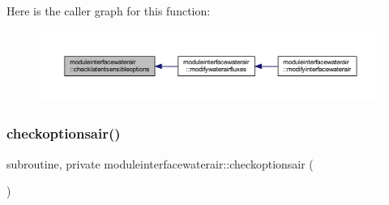 Here is the caller graph for this function\+:\nopagebreak
\begin{figure}[H]
\begin{center}
\leavevmode
\includegraphics[width=350pt]{namespacemoduleinterfacewaterair_a7ad682cf919390b70351f87d094eb4fb_icgraph}
\end{center}
\end{figure}
\mbox{\label{namespacemoduleinterfacewaterair_afa8defb4c07e4d9150f1507fc3ea475a}} 
\subsubsection{\texorpdfstring{checkoptionsair()}{checkoptionsair()}}
{\footnotesize\ttfamily subroutine, private moduleinterfacewaterair\+::checkoptionsair (\begin{DoxyParamCaption}{ }\end{DoxyParamCaption})\hspace{0.3cm}{\ttfamily [private]}}

